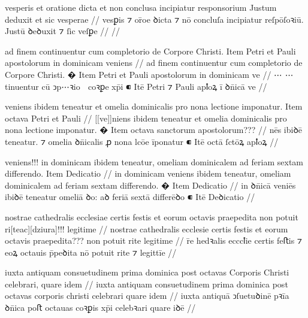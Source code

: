 \ex \bg
\gla
{}
vesperis
et oratione dicta et non conclusa incipiatur responsorium Justum deduxit et sic vesperae
//
\glRekonstrukcja
{}
vesꝑis ⁊ or̄oe ꝺicta ⁊ nō concluſa incipiatur reſpōſoꝛiū. Justū ꝺeꝺuxit ⁊ ſic veſꝑe
//
\glU
{}
//
\endgl
\xe



\ex \bg
\gla
{}
ad finem continuentur cum completorio de Corpore Christi.
{} Item Petri et Pauli apostolorum in dominicam veniens
//
\glRekonstrukcja
{}
ad finem continuentur cum completorio de Corpore Christi.
� Item Petri et Pauli apostolorum in dominicam ve
//
\glU
{}
⋯ ⋯ tinuentur cū ↄp⋯ꝛio  coꝛꝑe xp̄i ⁌ Itē Petri ⁊ Pauli apꝉoꝝ ī ꝺn̄icā ve
//
\endgl
\xe



\ex \bg
\gla
{}
veniens ibidem
teneatur et omelia dominicalis pro nona lectione imponatur.
{} Item octava Petri et Pauli {} {}
//
\glRekonstrukcja
{}
[[ve]]niens ibidem
teneatur et omelia dominicalis pro nona lectione imponatur.
� Item octava {} {} {} sanctorum apostolorum???
//
\glU
{}
nēs ibiꝺē teneatur. ⁊ omelia ꝺn̄icalis ꝓ nona lcōe īponatur ⁌ Itē octā {} {} {} ſctōꝝ apꝉoꝝ
//
\endgl
\xe



\ex \bg
\gla
{}
veniens!!! in dominicam {} ibidem teneatur,
omeliam dominicalem ad feriam sextam differendo.
{} Item Dedicatio
//
\glRekonstrukcja
{}
{} in dominicam  veniens ibidem teneatur,
omeliam dominicalem ad feriam sextam differendo.
� Item Dedicatio
//
\glU
{}
{} in ꝺn̄icā  veniēs ibiꝺē teneatur omeliā ꝺo: aꝺ feriā sextā diﬀerēꝺo ⁌ Itē Deꝺicatio
//
\endgl
\xe



\ex \bg
\gla
{}
nostrae cathedralis ecclesiae certis festis et eorum
octavis praepedita non potuit ri[teac][dziura]!!! legitime
//
\glRekonstrukcja
{}
nostrae cathedralis ecclesie certis festis et eorum
octavis praepedita??? non potuit rite {} legitime
//
\glU
{}
r̄e hedꝛalis ecccꝉie certis feﬅis ⁊ eoꝝ octauis p̄peꝺita nō potuit rite ⁊ legittīe
//
\endgl
\xe



\ex \bg
\gla
{}
iuxta antiquam consuetudinem prima dominica post octavas Corporis Christi celebrari, quare
idem
//
\glRekonstrukcja
{}
iuxta antiquam consuetudinem prima dominica post octavas corporis christi celebrari quare
idem
//
\glU
{}
iuxta antiquā ↄſuetuꝺinē pꝛīa ꝺn̄ica poﬅ octauas coꝛꝑis xp̄i celebꝛari quare iꝺē
//
\endgl
\xe



